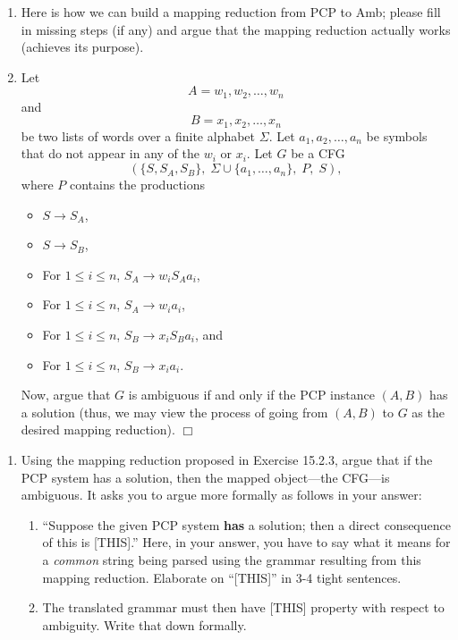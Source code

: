 \documentclass[12pt]{article}
\begin{document}
\begin{enumerate}
  \begin{enumerate}
\item[] \label{pcpambmr}
    Here is how we can build a mapping reduction from
PCP to Amb; please fill in missing steps
(if any) and argue that the mapping reduction actually works
(achieves its purpose).
\item[]
Let
\[ A = w_1,w_2,\ldots,w_n \]
and
\[ B = x_1,x_2,\ldots,x_n \]
be two lists of words over a finite alphabet $\Sigma$.
Let $a_1,a_2,\ldots,a_n$ be symbols that do not appear in any of 
the $w_i$ or $x_i$.
Let $G$ be a CFG
\[ (\{S,S_A,S_B\},\; \Sigma\cup\{a_1,\ldots,a_n\},\; P, \; S), \]
where $P$ contains the productions
\begin{itemize}
  \item[] $S\rightarrow S_A$,
  \item[] $S\rightarrow S_B$,
  \item[] For $1\leq i\leq n$, $S_A\rightarrow w_i S_A a_i$,
  \item[] For $1\leq i\leq n$, $S_A\rightarrow w_i a_i$,
  \item[] For $1\leq i\leq n$, $S_B\rightarrow x_i S_B a_i$, and
  \item[] For $1\leq i\leq n$, $S_B\rightarrow x_i a_i$.
\end{itemize}
Now, argue that $G$ is ambiguous if and only if the PCP instance 
$(A,B)$ has a solution
(thus, we may view the process of going from $(A,B)$ to 
$G$ as the desired mapping reduction). \hfill $\Box$
  \end{enumerate}

  \begin{enumerate}
  \item 
    Using the mapping reduction proposed in Exercise 15.2.3, 
    argue that
    if the PCP system has a solution, then the mapped object---the CFG---is
    ambiguous.
    It asks you to argue more formally as follows in your answer:
    
    \begin{enumerate}
    \item 
      ``Suppose the given
      PCP system {\bf has} a solution;
     then a direct consequence of this
      is [THIS].'' Here, in your answer, you have to say what it means for
      a {\em common} string being parsed using the grammar resulting from
      this mapping reduction. Elaborate on ``[THIS]'' in 3-4 tight sentences.


    \item The translated grammar must then have [THIS] property with respect
      to ambiguity. Write that down formally.
      

\end{enumerate}
\end{enumerate}
\end{enumerate}
\end{document}
